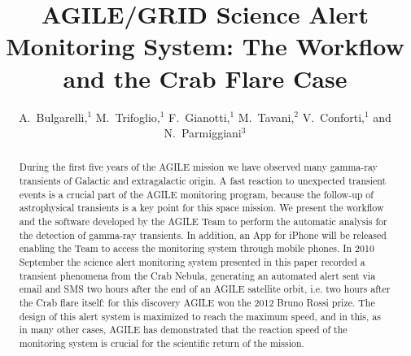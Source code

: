 
\resetcounters


\title{AGILE/GRID Science Alert Monitoring System: The Workflow and the Crab Flare Case}
\author{A.~Bulgarelli,$^1$ M.~Trifoglio,$^1$ F.~Gianotti,$^1$ 
M.~Tavani,$^2$ V.~Conforti,$^1$ and N.~Parmiggiani$^3$
}


\begin{abstract}
During the first five years of the AGILE mission we have observed many gamma-ray transients of Galactic and extragalactic origin. A fast reaction to unexpected transient events is a crucial part of the AGILE monitoring program, because the follow-up of astrophysical transients is a key point for this space mission. We present the workflow and the software developed by the AGILE Team to perform the automatic analysis  for the detection of gamma-ray transients. In addition, an App for iPhone will be released enabling the  Team to access the monitoring system through mobile phones. In 2010 September the science alert monitoring system presented in this paper recorded a transient phenomena from the Crab Nebula, generating an automated alert sent via email and SMS two hours after the end of an AGILE satellite orbit, i.e. two hours after the Crab flare itself: for this discovery AGILE won the 2012 Bruno Rossi prize. The design of this alert system is maximized to reach the maximum speed, and in this, as in many other cases, AGILE has demonstrated that the reaction speed of the monitoring system is crucial for the scientific return of the mission. 
\end{abstract}

